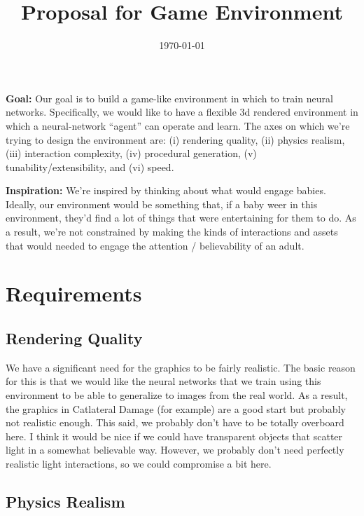 \documentclass[12pt]{article}
\title{Proposal for Game Environment}
\author{}
\date{\today}
\begin{document}
\maketitle

\textbf{Goal:}  Our goal is to build a game-like environment in which to train neural networks.  Specifically, we would like to have a flexible 3d rendered environment in which a neural-network ``agent'' can operate and learn.   The axes on which we're trying to design the environment are: (i) rendering quality, (ii) physics realism, (iii) interaction complexity, (iv) procedural generation, (v) tunability/extensibility, and (vi) speed.

\textbf{Inspiration:}  We're  inspired by thinking about what would engage babies.   Ideally, our environment would be something that, if a baby weer in this environment, they'd find a lot of things that were entertaining for them to do.   As a result, we're not constrained by making the kinds of interactions and assets that would needed to engage the attention / believability of an adult.  


\section*{Requirements}

\subsection*{Rendering Quality}

We have a significant need for the graphics to be fairly realistic.   The basic reason for this is that we would like the neural networks that we train using this environment to be able to generalize to images from the real world.   As a result, the graphics in Catlateral Damage (for example) are a good start but probably not realistic enough.    This said, we probably don't have to be totally overboard here.   I think it would be nice if we could have transparent objects that scatter light in a somewhat believable way.   However, we probably don't need  perfectly realistic light interactions, so we could compromise a bit here.     

\subsection*{Physics Realism}  
\end{document}
